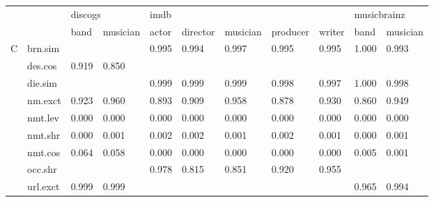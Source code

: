 \documentclass[epsfig,a4paper,11pt,titlepage,twoside,openany]{book}
\begin{document}
\begin{table}[H]
\centering
\begin{tabular}{ll|l|l|l|l|l|l|l|l|l|}
\cline{3-11}
                                                       &          & \multicolumn{2}{l|}{discogs} & \multicolumn{5}{l|}{imdb}                       & \multicolumn{2}{l|}{musicbrainz} \\ \cline{3-11} 
                                                       &          & band        & musician       & actor & director & musician & producer & writer & band          & musician         \\ \hline \hline
\multicolumn{1}{|l|}{\multirow{10}{*}{C}} & brn.sim  &             &                & 0.995 & 0.994    & 0.997    & 0.995    & 0.995  & 1.000         & 0.993            \\ \cline{2-11} 
\multicolumn{1}{|l|}{}                                 & des.cos  & 0.919       & 0.850          &       &          &          &          &        &               &                  \\ \cline{2-11} 
\multicolumn{1}{|l|}{}                                 & die.sim  &             &                & 0.999 & 0.999    & 0.999    & 0.998    & 0.997  & 1.000         & 0.998            \\ \cline{2-11} 
\multicolumn{1}{|l|}{}                                 & nm.exct  & 0.923       & 0.960          & 0.893 & 0.909    & 0.958    & 0.878    & 0.930  & 0.860         & 0.949            \\ \cline{2-11} 
\multicolumn{1}{|l|}{}                                 & nmt.lev  & 0.000       & 0.000          & 0.000 & 0.000    & 0.000    & 0.000    & 0.000  & 0.000         & 0.000            \\ \cline{2-11} 
\multicolumn{1}{|l|}{}                                 & nmt.shr  & 0.000       & 0.001          & 0.002 & 0.002    & 0.001    & 0.002    & 0.001  & 0.000         & 0.001            \\ \cline{2-11} 
\multicolumn{1}{|l|}{}                                 & nmt.cos  & 0.064       & 0.058          & 0.000 & 0.000    & 0.000    & 0.000    & 0.000  & 0.005         & 0.001            \\ \cline{2-11} 
\multicolumn{1}{|l|}{}                                 & occ.shr  &             &                & 0.978 & 0.815    & 0.851    & 0.920    & 0.955  &               &                  \\ \cline{2-11} 
\multicolumn{1}{|l|}{}                                 & url.exct & 0.999       & 0.999          &       &          &          &          &        & 0.965         & 0.994            \\ \cline{2-11} 

\end{tabular}
\end{table}
\end{document}
